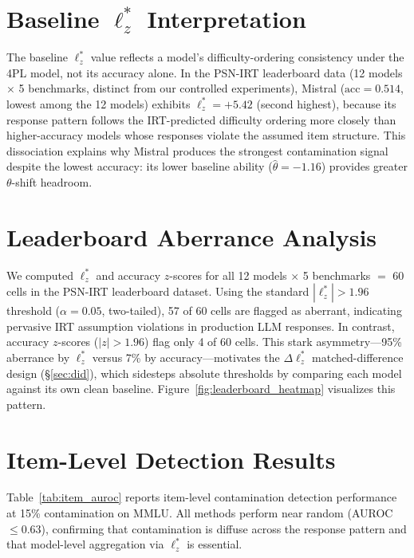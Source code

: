 \section{Baseline $\ell_z^*$ Interpretation}
\label{app:baseline_meaning}

The baseline $\ell_z^*$ value reflects a model's difficulty-ordering consistency under the 4PL model, not its accuracy alone.
In the PSN-IRT leaderboard data (12 models $\times$ 5 benchmarks, distinct from our controlled experiments), Mistral ($\text{acc}{=}0.514$, lowest among the 12 models) exhibits $\ell_z^*{=}{+}5.42$ (second highest), because its response pattern follows the IRT-predicted difficulty ordering more closely than higher-accuracy models whose responses violate the assumed item structure.
This dissociation explains why Mistral produces the strongest contamination signal despite the lowest accuracy: its lower baseline ability ($\hat{\theta}{=}{-}1.16$) provides greater $\theta$-shift headroom.

\section{Leaderboard Aberrance Analysis}
\label{app:leaderboard_aberrance}

We computed $\ell_z^*$ and accuracy $z$-scores for all 12 models $\times$ 5 benchmarks $=$ 60 cells in the PSN-IRT leaderboard dataset.
Using the standard $|\ell_z^*| > 1.96$ threshold ($\alpha{=}0.05$, two-tailed), 57 of 60 cells are flagged as aberrant, indicating pervasive IRT assumption violations in production LLM responses.
In contrast, accuracy $z$-scores ($|z| > 1.96$) flag only 4 of 60 cells.
This stark asymmetry---95\% aberrance by $\ell_z^*$ versus 7\% by accuracy---motivates the $\Delta\ell_z^*$ matched-difference design (\S\ref{sec:did}), which sidesteps absolute thresholds by comparing each model against its own clean baseline.
Figure~\ref{fig:leaderboard_heatmap} visualizes this pattern.

\section{Item-Level Detection Results}
\label{app:item_auroc}

Table~\ref{tab:item_auroc} reports item-level contamination detection performance at 15\% contamination on MMLU.
All methods perform near random (AUROC $\leq 0.63$), confirming that contamination is diffuse across the response pattern and that model-level aggregation via $\ell_z^*$ is essential.

